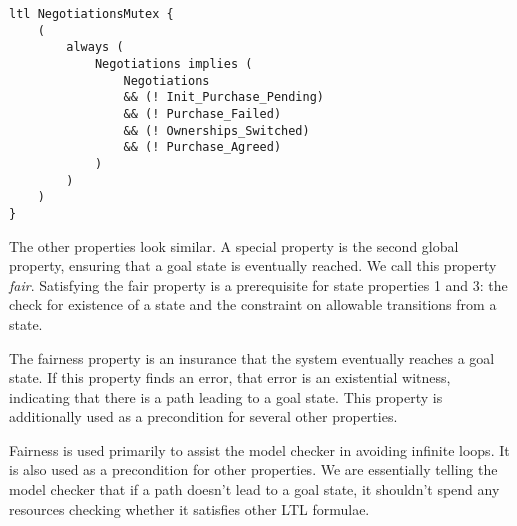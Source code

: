 \begin{lstlisting}[style=myPromela]
ltl NegotiationsMutex {
    (
        always (
            Negotiations implies (
                Negotiations
                && (! Init_Purchase_Pending)
                && (! Purchase_Failed)
                && (! Ownerships_Switched)
                && (! Purchase_Agreed)
            )
        )
    )
}
\end{lstlisting}

The other properties look similar. A special property is the second global property, ensuring that a goal state is eventually reached. We call this property \emph{fair}. Satisfying the fair property is a prerequisite for state properties 1 and 3: the check for existence of a state and the constraint on allowable transitions from a state.

The fairness property is an insurance that the system eventually reaches a goal state. If this property finds an error, that error is an existential witness, indicating that there is a path leading to a goal state. This property is additionally used as a precondition for several other properties.

Fairness is used primarily to assist the model checker in avoiding infinite loops. It is also used as a precondition for other properties. We are essentially telling the model checker that if a path doesn't lead to a goal state, it shouldn't spend any resources checking whether it satisfies other LTL formulae.

